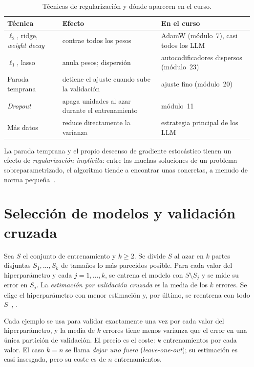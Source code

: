 \begin{table}[h]
\centering\small
\caption{Técnicas de regularización y dónde aparecen en el curso.}\label{tab:regularizacion}
\begin{tabular}{@{}>{\raggedright\arraybackslash}p{}>{\raggedright\arraybackslash}p{}>{\raggedright\arraybackslash}p{}@{}}
\toprule
Técnica & Efecto & En el curso \\
\midrule
$\ell_2$, ridge, \emph{weight decay} & contrae todos los pesos & AdamW (módulo~7), casi todos los LLM \\
$\ell_1$, lasso & anula pesos; dispersión & autocodificadores dispersos (módulo~23) \\
Parada temprana & detiene el ajuste cuando sube la validación & ajuste fino (módulo~20) \\
\emph{Dropout} & apaga unidades al azar durante el entrenamiento & módulo~11 \\
Más datos & reduce directamente la varianza & estrategia principal de los LLM \\
\bottomrule
\end{tabular}
\end{table}

La parada temprana y el propio descenso de gradiente estocástico tienen un efecto de \emph{regularización implícita}: entre las muchas soluciones de un problema sobreparametrizado, el algoritmo tiende a encontrar unas concretas, a menudo de norma pequeña~\cite[§9.2]{cs229}.

\section{Selección de modelos y validación cruzada}

\begin{definicion}\label{def:kfold}
Sea $S$ el conjunto de entrenamiento y $k\ge 2$. Se divide $S$ al azar en $k$ partes disjuntas $S_1,\dots,S_k$ de tamaños lo más parecidos posible. Para cada valor del hiperparámetro y cada $j=1,\dots,k$, se entrena el modelo con $S\setminus S_j$ y se mide su error en $S_j$. La \emph{estimación por validación cruzada} es la media de los $k$ errores. Se elige el hiperparámetro con menor estimación y, por último, se reentrena con todo $S$~\cite[§9.3]{cs229}, \cite[§7.10.1]{esl}.
\end{definicion}

Cada ejemplo se usa para validar exactamente una vez por cada valor del hiperparámetro, y la media de $k$ errores tiene menos varianza que el error en una única partición de validación. El precio es el coste: $k$ entrenamientos por cada valor. El caso $k=n$ se llama \emph{dejar uno fuera} (\emph{leave-one-out}); su estimación es casi insesgada, pero su coste es de $n$ entrenamientos.

